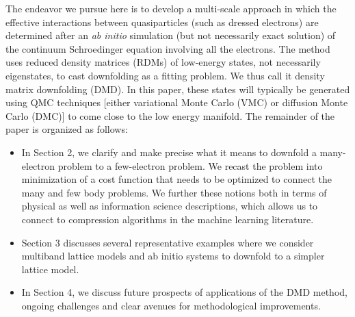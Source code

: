 The endeavor we pursue here is to develop a multi-scale approach in which the effective interactions between quasiparticles (such as dressed electrons) are determined after an \textit{ab initio} simulation (but not necessarily exact solution) of the continuum Schroedinger equation involving all the electrons. 
The method uses reduced density matrices (RDMs) of low-energy states, not necessarily eigenstates, 
to cast downfolding as a fitting problem. 
We thus call it density matrix downfolding (DMD).
In this paper, these states will typically be generated using QMC techniques [either variational Monte Carlo (VMC) or diffusion Monte Carlo (DMC)] to come close to the low energy manifold.
The remainder of the paper is organized as follows:
\begin{itemize} 
\item 	In Section 2, we clarify and make precise what it means to downfold 
a many-electron problem to a few-electron problem. We recast the problem into minimization 
of a cost function that needs to be optimized to connect the many and few body problems. We further 
these notions both in terms of physical as well as information science descriptions, which allows us to connect to compression algorithms in the machine learning literature. 
\item Section 3 discusses several representative examples where we consider multiband lattice models 
and ab initio systems to downfold to a simpler lattice model. 
\item In Section 4, we discuss future prospects of applications of the DMD method, ongoing challenges 
and clear avenues for methodological improvements. 
\end{itemize}


